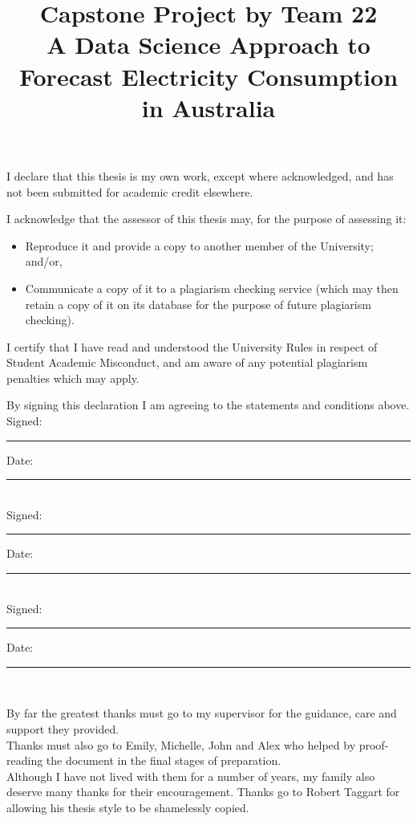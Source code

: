 \documentclass[mstat,12pt]{unswthesis}
\title{Capstone Project by Team 22\\[0.5cm]A Data Science Approach to
Forecast Electricity Consumption in Australia}
\author{\Authornameonly}
\begin{document}
\beforepreface




\vskip 2pc \noindent I declare that this thesis is my
own work, except where acknowledged, and has not been submitted for
academic credit elsewhere. 

\vskip 2pc  \noindent I acknowledge that the assessor of this
thesis may, for the purpose of assessing it:
\begin{itemize}
\item Reproduce it and provide a copy to another member of the University; and/or,
\item Communicate a copy of it to a plagiarism checking service (which may then retain a copy of it on its database for the purpose of future plagiarism checking).
\end{itemize}

\vskip 2pc \noindent I certify that I have read and understood the University Rules in
respect of Student Academic Misconduct, and am aware of any potential plagiarism penalties which may 
apply.\vspace{24pt}

\vskip 2pc \noindent By signing 
this declaration I am
agreeing to the statements and conditions above.
\vskip 2pc \noindent
Signed: \rule{7cm}{0.25pt} \hfill Date: \rule{4cm}{0.25pt} \\[1cm]
Signed: \rule{7cm}{0.25pt} \hfill Date: \rule{4cm}{0.25pt} \\[1cm]
Signed: \rule{7cm}{0.25pt} \hfill Date: \rule{4cm}{0.25pt} \\[1cm]
\vskip 1pc





{\bigskip}By far the greatest thanks must go to my supervisor for the
guidance, care and support they provided.\\[1cm] Thanks must also go to
Emily, Michelle, John and Alex who helped by proof-reading the document
in the final stages of preparation.\\[1cm] Although I have not lived
with them for a number of years, my family also deserve many thanks for
their encouragement. Thanks go to Robert Taggart for allowing his thesis
style to be shamelessly copied.\\[1cm] 
\end{document}
